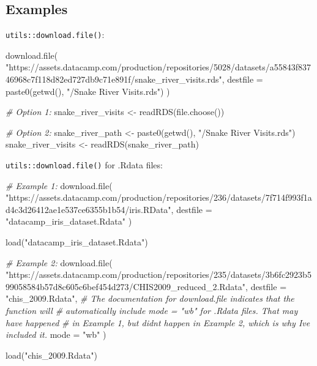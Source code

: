 \documentclass[
]{book}
\newenvironment{Shaded}{\begin{snugshade}}{\end{snugshade}}
\newcommand{\AttributeTok}[1]{\textcolor[rgb]{0.77,0.63,0.00}{#1}}
\newcommand{\CommentTok}[1]{\textcolor[rgb]{0.56,0.35,0.01}{\textit{#1}}}
\newcommand{\FunctionTok}[1]{\textcolor[rgb]{0.00,0.00,0.00}{#1}}
\newcommand{\NormalTok}[1]{#1}
\newcommand{\OtherTok}[1]{\textcolor[rgb]{0.56,0.35,0.01}{#1}}
\newcommand{\StringTok}[1]{\textcolor[rgb]{0.31,0.60,0.02}{#1}}
\begin{document}
\hypertarget{examples}{%
\subsection{Examples}\label{examples}}

\texttt{utils::download.file()}:

\begin{Shaded}
\begin{Highlighting}[]
\FunctionTok{download.file}\NormalTok{(}
  \StringTok{"https://assets.datacamp.com/production/repositories/5028/datasets/a55843f83746968c7f118d82ed727db9c71e891f/snake\_river\_visits.rds"}\NormalTok{,}
  \AttributeTok{destfile =} \FunctionTok{paste0}\NormalTok{(}\FunctionTok{getwd}\NormalTok{(), }\StringTok{"/Snake River Visits.rds"}\NormalTok{)}
\NormalTok{)}

\CommentTok{\# Option 1:}
\NormalTok{snake\_river\_visits }\OtherTok{\textless{}{-}} \FunctionTok{readRDS}\NormalTok{(}\FunctionTok{file.choose}\NormalTok{())}

\CommentTok{\# Option 2:}
\NormalTok{snake\_river\_path   }\OtherTok{\textless{}{-}} \FunctionTok{paste0}\NormalTok{(}\FunctionTok{getwd}\NormalTok{(), }\StringTok{"/Snake River Visits.rds"}\NormalTok{)}
\NormalTok{snake\_river\_visits }\OtherTok{\textless{}{-}} \FunctionTok{readRDS}\NormalTok{(snake\_river\_path)}
\end{Highlighting}
\end{Shaded}

\texttt{utils::download.file()} for .Rdata files:

\begin{Shaded}
\begin{Highlighting}[]
\CommentTok{\# Example 1:}
\FunctionTok{download.file}\NormalTok{(}
  \StringTok{"https://assets.datacamp.com/production/repositories/236/datasets/7f714f993f1ad4c3d26412ae1e537ce6355b1b54/iris.RData"}\NormalTok{, }
  \AttributeTok{destfile =} \StringTok{"datacamp\_iris\_dataset.Rdata"}
\NormalTok{)}

\FunctionTok{load}\NormalTok{(}\StringTok{"datacamp\_iris\_dataset.Rdata"}\NormalTok{)}

\CommentTok{\# Example 2:}
\FunctionTok{download.file}\NormalTok{(}
  \StringTok{"https://assets.datacamp.com/production/repositories/235/datasets/3b6fc2923b599058584b57d8c605c6bef454d273/CHIS2009\_reduced\_2.Rdata"}\NormalTok{,}
  \AttributeTok{destfile =} \StringTok{"chis\_2009.Rdata"}\NormalTok{,}
  \CommentTok{\# The documentation for \textasciigrave{}download.file\textasciigrave{} indicates that the function will}
  \CommentTok{\# automatically include \textasciigrave{}mode = "wb"\textasciigrave{} for .Rdata files. That may have happened}
  \CommentTok{\# in Example 1, but didn\textquotesingle{}t happen in Example 2, which is why I\textquotesingle{}ve included it.}
  \AttributeTok{mode =} \StringTok{"wb"}
\NormalTok{)}

\FunctionTok{load}\NormalTok{(}\StringTok{"chis\_2009.Rdata"}\NormalTok{)}
\end{Highlighting}
\end{Shaded}
\end{document}
